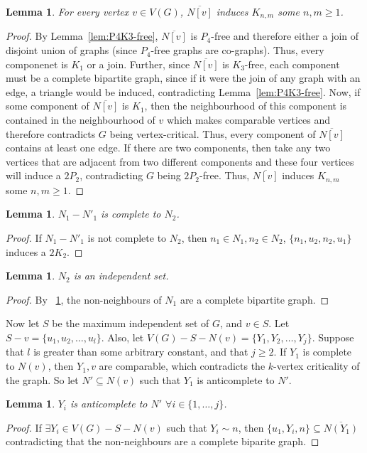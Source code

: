 \documentclass[11pt]{article}
\newtheorem{lemma}[theorem]{Lemma}
\theoremstyle{definition}
\newcommand{\noneighbs}{\overline{N[v]}}
\begin{document}
\begin{lemma}\label{lem:completebipartite}
For every vertex $v\in V(G)$,  $\noneighbs$ induces $K_{n,m}$ some $n,m\ge 1$.
\end{lemma}
\begin{proof}
By Lemma~\ref{lem:P4K3-free}, $\noneighbs$ is $P_4$-free and therefore either a join of disjoint union of graphs (since $P_4$-free graphs are co-graphs). Thus, every componenet is $K_1$ or a join. Further, since $\noneighbs$ is $K_3$-free, each component must be a complete bipartite graph, since if it were the join of any graph with an edge, a triangle would be induced, contradicting Lemma~\ref{lem:P4K3-free}. Now, if some component of $\noneighbs$ is $K_1$, then the neighbourhood of this component is contained in the neighbourhood of $v$ which makes comparable vertices and therefore contradicts $G$ being vertex-critical. Thus, every component of $\noneighbs$ contains at least one edge. If there are two components, then take any two vertices that are adjacent from two different components and these four vertices will induce a $2P_2$, contradicting $G$ being $2P_2$-free. Thus,  $\noneighbs$ induces $K_{n,m}$ some $n,m\ge 1$.
\end{proof}

\begin{lemma}\label{lem:neighbscomplete}
$N_1 - N'_1$ is complete to $N_2$.
\end{lemma}
\begin{proof}
If $N_1 - N'_1$ is not complete to $N_2$, then $n_1 \in N_1, n_2 \in N_2$, $\{ n_1, u_2, n_2, u_1 \}$ induces a $2K_2$.
\end{proof}
\begin{lemma}\label{lem:n2indep}
$N_2$ is an independent set.
\end{lemma}
\begin{proof}
By ~\ref{lem:completebipartite}, the non-neighbours of $N_1$ are a complete bipartite graph.
\end{proof}

Now let $S$ be the maximum independent set of $G$, and $v \in S$. Let $S - v = \{u_1, u_2, \dots, u_l \}$. Also, let $V(G) - S - N(v) = \{Y_1, Y_2, \dots, Y_j\}$. Suppose that $l$ is greater than some arbitrary constant, and that $j \geq 2$. If $Y_1$ is complete to $N(v)$, then $Y_1, v$ are comparable, which contradicts the $k$-vertex criticality of the graph. So let $N' \subseteq N(v)$ such that $Y_1$ is anticomplete to $N'$.

\begin{lemma}\label{lem:anticomplete}
$Y_i$ is anticomplete to $N'$ $\forall i \in \{1, \dots, j\}$.
\end{lemma}
\begin{proof}
If $\exists Y_i \in V(G) - S - N(v)$ such that $Y_i \sim n$, then $\{ u_1, Y_i, n \} \subseteq \overline{N(Y_1)}$ contradicting that the non-neighbours are a complete biparite graph. 
\end{proof}
\end{document}
